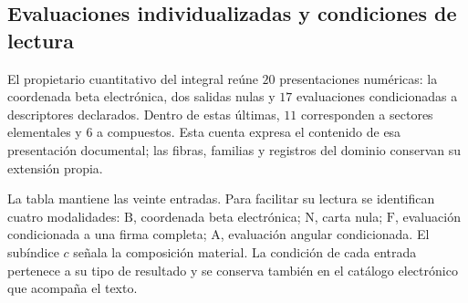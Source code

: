 \subsection{Evaluaciones individualizadas y condiciones de lectura}
\label{subsec:vi-evaluaciones-documentadas}

El propietario cuantitativo del integral reúne \(20\) presentaciones
numéricas: la coordenada beta electrónica, dos salidas nulas y
\(17\) evaluaciones condicionadas a descriptores declarados. Dentro de
estas últimas, \(11\) corresponden a sectores elementales y \(6\) a
compuestos. Esta cuenta expresa el contenido de esa presentación documental;
las fibras, familias y registros del dominio conservan su extensión propia.

La tabla mantiene las veinte entradas. Para facilitar su lectura se
identifican cuatro modalidades: \(\mathrm{B}\), coordenada beta
electrónica; \(\mathrm{N}\), carta nula; \(\mathrm{F}\), evaluación
condicionada a una firma completa; \(\mathrm{A}\), evaluación angular
condicionada. El subíndice \(c\) señala la composición material. La
condición de cada entrada pertenece a su tipo de resultado y se conserva
también en el catálogo electrónico que acompaña el texto.

